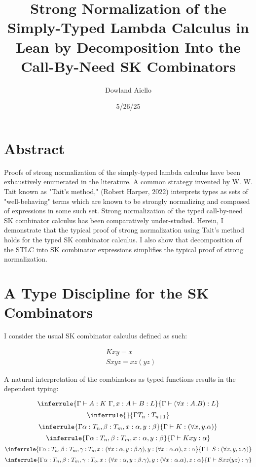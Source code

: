 \documentclass[11pt]{article}
\author{Dowland Aiello}
\date{5/26/25}
\title{Strong Normalization of the Simply-Typed Lambda Calculus in Lean by Decomposition Into the Call-By-Need SK Combinators}
\begin{document}
\maketitle
\tableofcontents

\section{Abstract}
\label{sec:org9f27b86}

Proofs of strong normalization of the simply-typed lambda calculus have been exhaustively enumerated in the literature. A common strategy invented by W. W. Tait known as "Tait's method," (Robert Harper, 2022) interprets types as sets of "well-behaving" terms which are known to be strongly normalizing and composed of expressions in some such set.
Strong normalization of the typed call-by-need SK combinator calculus has been comparatively under-studied. Herein, I demonstrate that the typical proof of strong normalization using Tait's method holds for the typed SK combinator calculus. I also show that decomposition of the STLC into SK combinator expressions simplifies the typical proof of strong normalization.
\section{A Type Discipline for the SK Combinators}
\label{sec:org4962f50}

I consider the usual SK combinator calculus defined as such:

\begin{align}
& K xy = x \\
& S xyz = xz (yz)
\end{align}

A natural interpretation of the combinators as typed functions results in the dependent typing:

\label{inference:1}

\[
\inferrule
  { \Gamma \vdash A : K \ \Gamma,x : A \vdash B : L }
  { \Gamma \vdash (\forall x : A.B) : L}
\]
\[
\inferrule
  { }
  { \Gamma T_{n} : T_{n + 1} }
\]
\[
\inferrule
  { \Gamma \alpha : T_{n}, \beta : T_{m}, x : \alpha, y : \beta }
  { \Gamma \vdash K : (\forall x, y.\alpha) }
\]
\[
\inferrule
  { \Gamma \alpha : T_{n}, \beta : T_{m}, x : \alpha, y : \beta }
  { \Gamma \vdash K x y : \alpha }
\]
\[
\inferrule
  { \Gamma \alpha : T_{n}, \beta : T_{m}, \gamma : T_{o}, x : (\forall x : \alpha, y : \beta.\gamma), y : (\forall x : \alpha.\alpha), z : \alpha }
  { \Gamma \vdash S : (\forall x, y, z.\gamma) }
\]
\[
\inferrule
  { \Gamma \alpha : T_{n}, \beta : T_{m}, \gamma : T_{o}, x : (\forall x : \alpha, y : \beta.\gamma), y : (\forall x : \alpha.\alpha), z : \alpha }
  { \Gamma \vdash S x z (y z) : \gamma }
\]
\end{document}
